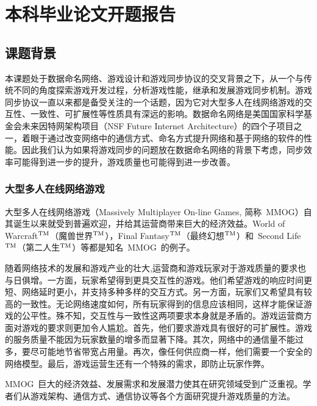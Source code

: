\chapter{本科毕业论文开题报告}

\def\tm{\leavevmode\hbox{$\rm {}^{TM}$}} %
\section{课题背景}
本课题处于数据命名网络、游戏设计和游戏同步协议的交叉背景之下，从一个与传统不同的角度探索游戏开发过程，分析游戏性能，继承和发展游戏同步机制。游戏同步协议一直以来都是备受关注的一个话题，因为它对大型多人在线网络游戏的交互性、一致性、可扩展性等性质具有深远的影响。数据命名网络是美国国家科学基金会未来因特网架构项目（NSF Future Internet Architecture）的四个子项目之一，着眼于通过改变网络中的通信方式、命名方式提升网络和基于网络的软件的性能。因此我们认为如果将游戏同步的问题放在数据命名网络的背景下考虑，同步效率可能得到进一步的提升，游戏质量也可能得到进一步改善。

\subsection{大型多人在线网络游戏}
大型多人在线网络游戏（Massively Multiplayer On-line Games, 简称~MMOG）自其诞生以来就受到普遍欢迎，并给其运营商带来巨大的经济效益。World of Warcraft\tm（魔兽世界\tm），Final Fantasy\tm（最终幻想\tm）和~Second Life\tm（第二人生\tm）等都是知名~MMOG~的例子。

随着网络技术的发展和游戏产业的壮大,运营商和游戏玩家对于游戏质量的要求也与日俱增。一方面，玩家希望得到更具交互性的游戏。他们希望游戏的响应时间更短、网络延时更小，并支持多种多样的交互方式。另一方面，玩家们又希望具有较高的一致性。无论网络速度如何，所有玩家得到的信息应该相同，这样才能保证游戏的公平性。殊不知，交互性与一致性这两项要求本身就是矛盾的。游戏运营商方面对游戏的要求则更加令人尴尬。首先，他们要求游戏具有很好的可扩展性。游戏的服务质量不能因为玩家数量的增多而显著下降。其次，网络中的通信量不能过多，要尽可能地节省带宽占用量。再次，像任何供应商一样，他们需要一个安全的网络模型。最后，游戏运营生还有一个特殊的需求，即防止玩家作弊。

MMOG~巨大的经济效益、发展需求和发展潜力使其在研究领域受到广泛重视。学者们从游戏架构、通信方式、通信协议等各个方面研究提升游戏质量的方法。


